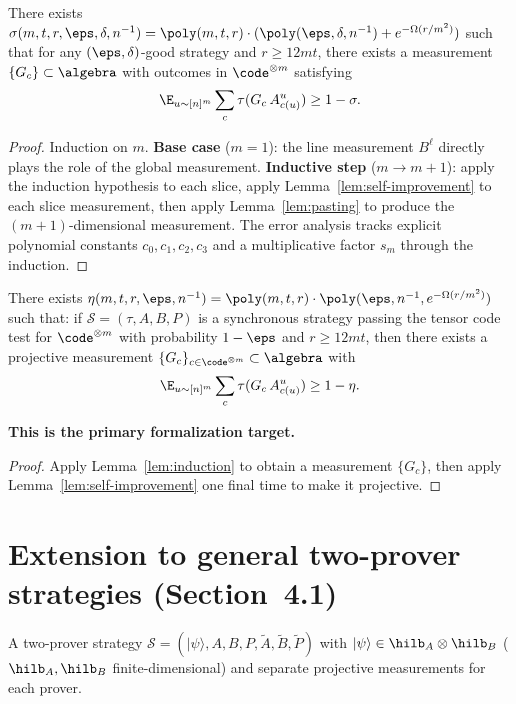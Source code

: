 \begin{lemma}\label{lem:induction}
  There exists
  $\sigma(m,t,r,\eps,\delta,n^{-1})=\poly(m,t,r)\cdot(\poly(\eps,\delta,n^{-1})+e^{-\Omega(r/m^2)})$
  such that for any $(\eps,\delta)$-good strategy and $r\ge 12mt$,
  there exists a measurement $\{G_c\}\subset\algebra$ with outcomes in
  $\code^{\otimes m}$ satisfying
  \[
    \E_{u\sim[n]^m}\sum_c\tau(G_c\,A^u_{c(u)})\ge 1-\sigma.
  \]
\end{lemma}
\begin{proof}
  Induction on $m$.
  \textbf{Base case} ($m=1$): the line measurement $B^\ell$ directly
  plays the role of the global measurement.
  \textbf{Inductive step} ($m\to m+1$): apply the induction hypothesis
  to each slice, apply Lemma~\ref{lem:self-improvement} to each slice
  measurement, then apply Lemma~\ref{lem:pasting} to produce the
  $(m+1)$-dimensional measurement.
  The error analysis tracks explicit polynomial constants $c_0,c_1,c_2,c_3$
  and a multiplicative factor $s_m$ through the induction.
\end{proof}

\begin{theorem}\label{thm:main}
  There exists
  $\eta(m,t,r,\eps,n^{-1})=\poly(m,t,r)\cdot\poly(\eps,n^{-1},e^{-\Omega(r/m^2)})$
  such that: if $\mathcal{S}=(\tau,A,B,P)$ is a synchronous strategy passing
  the tensor code test for $\code^{\otimes m}$ with probability $1-\eps$ and
  $r\ge 12mt$, then there exists a projective measurement
  $\{G_c\}_{c\in\code^{\otimes m}}\subset\algebra$ with
  \[
    \E_{u\sim[n]^m}\sum_c\tau(G_c\,A^u_{c(u)})\ge 1-\eta.
  \]

  \textbf{This is the primary formalization target.}
\end{theorem}
\begin{proof}
  Apply Lemma~\ref{lem:induction} to obtain a measurement $\{G_c\}$, then
  apply Lemma~\ref{lem:self-improvement} one final time to make it projective.
\end{proof}

\section{Extension to general two-prover strategies (Section~4.1)}

\begin{definition}\label{def:two-prover-strat}
  A two-prover strategy
  $\mathcal{S}=(|\psi\rangle,A,B,P,\tilde A,\tilde B,\tilde P)$ with
  $|\psi\rangle\in\hilb_A\otimes\hilb_B$
  ($\hilb_A,\hilb_B$ finite-dimensional)
  and separate projective measurements for each prover.
\end{definition}

